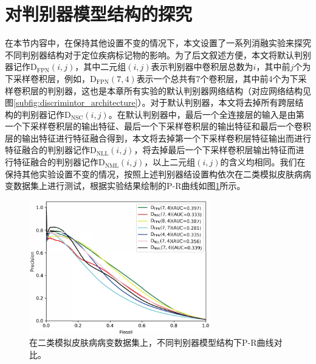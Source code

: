 \section{对判别器模型结构的探究}\label{sec:dis_arch}
在本节内容中，在保持其他设置不变的情况下，本文设置了一系列消融实验来探究不同判别器结构对于定位疾病标记物的影响。为了后文叙述方便，本文将默认判别器记作$\mathrm{D}_\mathrm{FPN}(i,j)$，其中二元组$(i,j)$表示判别器中卷积层总数为$i$，其中前$j$个为下采样卷积层，例如，$\mathrm{D}_\mathrm{FPN}(\mathrm{7},\mathrm{4})$表示一个总共有7个卷积层，其中前4个为下采样卷积层的判别器，这也是本章所有实验的默认判别器网络结构（对应网络结构见图\ref{subfig:discrimintor_architecture}）。对于默认判别器，本文将去掉所有跨层结构的判别器记作$\mathrm{D}_\mathrm{NSC}(i,j)$。在默认判别器中，最后一个全连接层的输入是由第一个下采样卷积层的输出特征、最后一个下采样卷积层的输出特征和最后一个卷积层的输出特征进行特征融合得到，本文将去掉第一个下采样卷积层特征输出而进行特征融合的判别器记作$\mathrm{D}_\mathrm{NLL}(i,j)$，将去掉最后一个下采样卷积层输出特征而进行特征融合的判别器记作$\mathrm{D}_\mathrm{NML}(i,j)$，以上二元组$(i,j)$的含义均相同。我们在保持其他实验设置不变的情况，按照上述判别器结设置构依次在二类模拟皮肤病病变数据集上进行测试，根据实验结果绘制的P-R曲线如图\ref{fig:pr_curve_skin_dis_arch}所示。
\begin{figure}[h]
	\centering
	\includegraphics[width=0.7\textwidth]{figure/pr_curve_dis_arch/pr_curve.pdf}
	\caption[不同判别器模型结构下P-R曲线对比]{在二类模拟皮肤病病变数据集上，不同判别器模型结构下P-R曲线对比。} 
	\label{fig:pr_curve_skin_dis_arch}
\end{figure}

